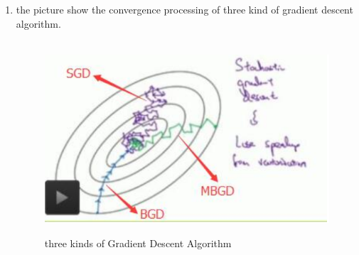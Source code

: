 \documentclass[12pt]{ctexart}%
\begin{document}
\begin{itemize}
\begin{enumerate}[(1)]
				\item the picture show the convergence processing of three kind of gradient descent algorithm.
					\begin{figure}[H]
						\vspace{-0.2cm}  %
						\setlength{\abovecaptionskip}{-0.2cm}   %
						\centering
						\includegraphics[scale=0.4]{Mini-Batch_Gradient_Descent.png}
						\renewcommand{\figurename}{Fig} %
						\caption{three kinds of Gradient Descent Algorithm}
						\label{fig:5}
					\end{figure}
			\end{enumerate}
		\end{itemize}
	
\end{document}
